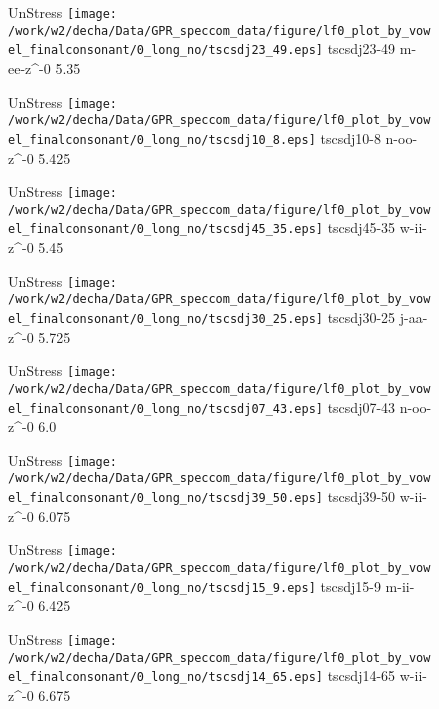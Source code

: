 \documentclass{article}
\begin{document}
\begin{figure}[t]
\begin{minipage}[b]{.24\textwidth}
UnStress
\centering
\texttt{[image: /work/w2/decha/Data/GPR\_speccom\_data/figure/lf0\_plot\_by\_vowel\_finalconsonant/0\_long\_no/tscsdj23\_49.eps]}
tscsdj23-49 m-ee-z\textasciicircum-0 5.35
\end{minipage}
\begin{minipage}[b]{.24\textwidth}
UnStress
\centering
\texttt{[image: /work/w2/decha/Data/GPR\_speccom\_data/figure/lf0\_plot\_by\_vowel\_finalconsonant/0\_long\_no/tscsdj10\_8.eps]}
tscsdj10-8 n-oo-z\textasciicircum-0 5.425
\end{minipage}
\begin{minipage}[b]{.24\textwidth}
UnStress
\centering
\texttt{[image: /work/w2/decha/Data/GPR\_speccom\_data/figure/lf0\_plot\_by\_vowel\_finalconsonant/0\_long\_no/tscsdj45\_35.eps]}
tscsdj45-35 w-ii-z\textasciicircum-0 5.45
\end{minipage}
\begin{minipage}[b]{.24\textwidth}
UnStress
\centering
\texttt{[image: /work/w2/decha/Data/GPR\_speccom\_data/figure/lf0\_plot\_by\_vowel\_finalconsonant/0\_long\_no/tscsdj30\_25.eps]}
tscsdj30-25 j-aa-z\textasciicircum-0 5.725
\end{minipage}
\end{figure}

\begin{figure}[t]
\begin{minipage}[b]{.24\textwidth}
UnStress
\centering
\texttt{[image: /work/w2/decha/Data/GPR\_speccom\_data/figure/lf0\_plot\_by\_vowel\_finalconsonant/0\_long\_no/tscsdj07\_43.eps]}
tscsdj07-43 n-oo-z\textasciicircum-0 6.0
\end{minipage}
\begin{minipage}[b]{.24\textwidth}
UnStress
\centering
\texttt{[image: /work/w2/decha/Data/GPR\_speccom\_data/figure/lf0\_plot\_by\_vowel\_finalconsonant/0\_long\_no/tscsdj39\_50.eps]}
tscsdj39-50 w-ii-z\textasciicircum-0 6.075
\end{minipage}
\begin{minipage}[b]{.24\textwidth}
UnStress
\centering
\texttt{[image: /work/w2/decha/Data/GPR\_speccom\_data/figure/lf0\_plot\_by\_vowel\_finalconsonant/0\_long\_no/tscsdj15\_9.eps]}
tscsdj15-9 m-ii-z\textasciicircum-0 6.425
\end{minipage}
\begin{minipage}[b]{.24\textwidth}
UnStress
\centering
\texttt{[image: /work/w2/decha/Data/GPR\_speccom\_data/figure/lf0\_plot\_by\_vowel\_finalconsonant/0\_long\_no/tscsdj14\_65.eps]}
tscsdj14-65 w-ii-z\textasciicircum-0 6.675
\end{minipage}
\end{figure}
\end{document}
